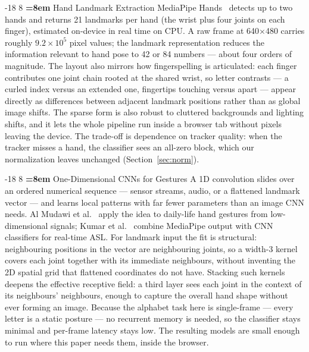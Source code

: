\documentclass{llncs}
\makeatletter
\renewcommand\subsection{\@startsection{subsection}{2}{\z@}%
                      {-18\p@ \@plus -4\p@ \@minus -4\p@}%
                      {8\p@ \@plus 4\p@ \@minus 4\p@}%
                      {\normalfont\large\bfseries\boldmath
                       \rightskip=\z@ \@plus 8em\pretolerance=10000 }}
\makeatother
\begin{document}
\subsection{Hand Landmark Extraction}
MediaPipe Hands~\cite{mediapipehands2020,mediapipe-framework} detects
up to two hands and returns 21 landmarks per hand (the wrist plus four
joints on each finger), estimated on-device in real time on CPU. A raw
frame at 640$\times$480 carries roughly $9.2\times10^{5}$ pixel
values; the landmark representation reduces the information relevant to
hand pose to 42 or 84 numbers --- about four orders of magnitude. The
layout also mirrors how fingerspelling is articulated: each finger
contributes one joint chain rooted at the shared wrist, so letter
contrasts --- a curled index versus an extended one, fingertips touching
versus apart --- appear directly as differences between adjacent
landmark positions rather than as global image shifts. The
sparse form is also robust to cluttered backgrounds and lighting shifts,
and it lets the whole pipeline run inside a browser tab without pixels
leaving the device. The trade-off is dependence on tracker quality: when
the tracker misses a hand, the classifier sees an all-zero block, which
our normalization leaves unchanged (Section~\ref{sec:norm}).

\subsection{One-Dimensional CNNs for Gestures}
A 1D convolution slides over an ordered numerical sequence --- sensor
streams, audio, or a flattened landmark vector --- and learns local
patterns with far fewer parameters than an image CNN needs. Al Mudawi et
al.~\cite{1d-cnn-healthcare} apply the idea to daily-life hand gestures
from low-dimensional signals; Kumar et al.~\cite{mediapipe-review}
combine MediaPipe output with CNN classifiers for real-time ASL. For
landmark input the fit is structural: neighbouring positions in the
vector are neighbouring joints, so a width-3 kernel covers each joint
together with its immediate neighbours, without inventing the 2D spatial
grid that flattened coordinates do not have. Stacking such kernels
deepens the effective receptive field: a third layer sees each joint in
the context of its neighbours' neighbours, enough to capture the overall
hand shape without ever forming an image. Because the alphabet task here
is single-frame --- every letter is a static posture --- no recurrent
memory is needed, so the classifier stays minimal and per-frame latency
stays low. The resulting models are
small enough to run where this paper needs them, inside the browser.
\end{document}
